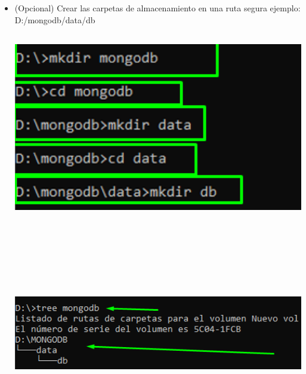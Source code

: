 \documentclass[12pt,a4paper,oneside]{book}
\begin{document}
	\newpage
\begin{itemize}
	\item {(Opcional) Crear las carpetas de almacenamiento en una ruta segura ejemplo: \\
	D:/mongodb/data/db}\\
	
	\includegraphics[width=16cm, height=9cm]{img/6.png}\\
	\includegraphics[width=16cm, height=9cm]{img/7.png}\\
	
	
\end{itemize}
\end{document}
